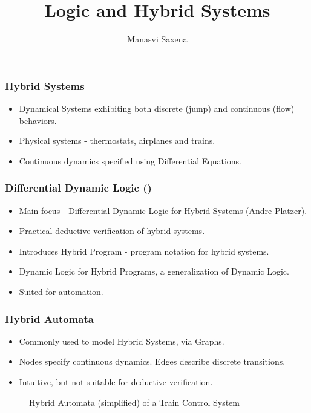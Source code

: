 \documentclass{beamer}
\title{Logic and Hybrid Systems}
\author{Manasvi Saxena}
\institute{Formal Systems Lab, UIUC}
\date{}
\newcommand{\dL}{\text{\upshape\textsf{d{\kern-0.05em}L}}}
\begin{document}
\frame{\titlepage}

\begin{frame}
\frametitle{Hybrid Systems}

\begin{itemize}
  \item Dynamical Systems exhibiting both discrete (jump) and continuous (flow) behaviors.
  \item Physical systems - thermostats, airplanes and trains.
  \item Continuous dynamics specified using Differential Equations.
\end{itemize}

\end{frame}

\begin{frame}
  \frametitle{Differential Dynamic Logic (\dL)}
  \begin{itemize}
    \item Main focus - Differential Dynamic Logic for Hybrid Systems (Andre
      Platzer).
      \pause
    \item Practical deductive verification of hybrid systems.
    \item Introduces Hybrid Program - program notation for hybrid systems.
    \item Dynamic Logic for Hybrid Programs, a generalization of Dynamic Logic.
    \item Suited for automation.
  \end{itemize}

\end{frame}

\begin{frame}
\frametitle{Hybrid Automata}
\begin{itemize}
  \item Commonly used to model Hybrid Systems, via Graphs.
  \item Nodes specify continuous dynamics. Edges describe discrete transitions.
  \item Intuitive, but not suitable for deductive verification.
\end{itemize}
    \pause
\begin{figure}\label{fig:train-HA}
  \centering
  \begin{tikzpicture}[shorten >=1pt,node distance=5cm,on grid,auto]
    
  \end{tikzpicture}
  \caption{Hybrid Automata (simplified) of a Train Control System}
\end{figure}
\end{frame}
\end{document}
